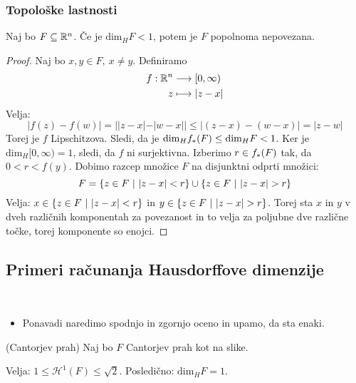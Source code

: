 \newpage
\subsubsection*{Topološke lastnosti}
\begin{trditev}
    Naj bo \(F \subseteq \mathbb{R}^n\). Če je \(\text{dim}_H F < 1\), potem je \(F\) popolnoma nepovezana.
\end{trditev}

\begin{proof}
    Naj bo \(x, y \in F, \ x \neq y\). Definiramo
    \begin{align*}
        f: \mathbb{R}^n &\longrightarrow [0, \infty) \\
        z &\longmapsto |z - x|
    \end{align*}
    Velja: 
    \[|f(z) - f(w)| = ||z-x| - |w-x|| \leq |(z-x) - (w-x)| = |z-w|\]
    Torej je \(f\) Lipschitzova. Sledi, da je \(\text{dim}_H f_{*}(F) \leq \text{dim}_H F< 1\). Ker je \(\text{dim}_H [0, \infty) = 1\), sledi, da \(f\) ni surjektivna. Izberimo \(r \in f_{*}(F)\) tak, da \(0 < r < f(y)\). Dobimo razcep množice \(F\) na disjunktni odprti množici: 
    \[F = \left\{z \in F \ | \ |z-x| < r\right\} \cup \left\{z \in F \ | \ |z-x| > r\right\}\]
    Velja: \(x \in \left\{z \in F \ | \ |z-x| < r\right\}\) in \(y \in \left\{z \in F \ | \ |z-x| > r\right\}\). Torej sta \(x\) in \(y\) v dveh različnih komponentah za povezanost in to velja za poljubne dve različne točke, torej komponente so enojci.
\end{proof}

\subsection{Primeri računanja Hausdorffove dimenzije}
\begin{opomba} \ 
    \begin{itemize}
        \item Ponavadi naredimo spodnjo in zgornjo oceno in upamo, da sta enaki.
    \end{itemize}
\end{opomba}
\begin{primer}(Cantorjev prah)
    Naj bo \(F\) Cantorjev prah kot na slike.

    Velja: \(1 \leq \mathcal{H}^{1}(F) \leq \sqrt{2}\). Posledično: \(\text{dim}_H F = 1\).
\end{primer}

